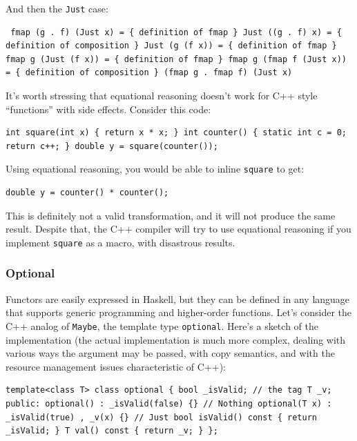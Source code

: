 And then the \texttt{Just} case:

\begin{verbatim}
 fmap (g . f) (Just x) = { definition of fmap } Just ((g . f) x) = { definition of composition } Just (g (f x)) = { definition of fmap } fmap g (Just (f x)) = { definition of fmap } fmap g (fmap f (Just x)) = { definition of composition } (fmap g . fmap f) (Just x)
\end{verbatim}

It's worth stressing that equational reasoning doesn't work for C++
style ``functions'' with side effects. Consider this code:

\begin{verbatim}
int square(int x) { return x * x; } int counter() { static int c = 0; return c++; } double y = square(counter());
\end{verbatim}

Using equational reasoning, you would be able to inline \texttt{square}
to get:

\begin{verbatim}
double y = counter() * counter();
\end{verbatim}

This is definitely not a valid transformation, and it will not produce
the same result. Despite that, the C++ compiler will try to use
equational reasoning if you implement \texttt{square} as a macro, with
disastrous results.

\subsubsection{Optional}\label{optional}

Functors are easily expressed in Haskell, but they can be defined in any
language that supports generic programming and higher-order functions.
Let's consider the C++ analog of \texttt{Maybe}, the template type
\texttt{optional}. Here's a sketch of the implementation (the actual
implementation is much more complex, dealing with various ways the
argument may be passed, with copy semantics, and with the resource
management issues characteristic of C++):

\begin{verbatim}
template<class T> class optional { bool _isValid; // the tag T _v; public: optional() : _isValid(false) {} // Nothing optional(T x) : _isValid(true) , _v(x) {} // Just bool isValid() const { return _isValid; } T val() const { return _v; } };
\end{verbatim}

